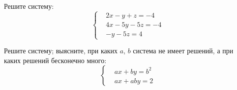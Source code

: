 %
%


\begin{problems}

\item
Решите систему:
\[\left\{\begin{aligned}&
    2 x - y + z = -4
\\&
    4 x - 5 y - 5 z = -4
\\&
    - y - 5 z = 4
\end{aligned}\right.\]

\item
Решите систему; выясните, при каких $a$, $b$ система не имеет решений, а при
каких решений бесконечно много:
\[\left\{\begin{aligned}&
    a x + b y = b^2
\\&
    a x + a b y = 2
\end{aligned}\right.\]

\end{problems}

